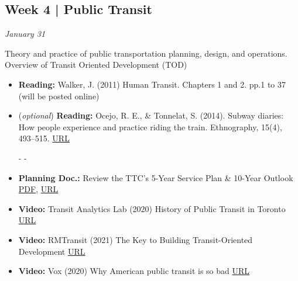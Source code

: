 \documentclass[11pt]{article}
\begin{document}
	
	

	

		
	\subsection*{Week 4 | Public Transit}
	
	\textit{January 31}
	
	Theory and practice of public transportation planning, design, and operations. Overview of Transit Oriented Development (TOD)
	
	\begin{itemize}
		\item \textbf{Reading:} Walker, J. (2011) Human Transit. Chapters 1 and 2. pp.1 to 37 (will be posted online)
		
		\item (\textit{optional}) \textbf{Reading:} Ocejo, R. E., \& Tonnelat, S. (2014). Subway diaries: How people experience and practice riding the train. Ethnography, 15(4), 493–515.
		\href{https://doi.org/10.1177/1466138113491171}{URL}
		
		- -
		
		\item \textbf{Planning Doc.:} Review the TTC’s 5-Year Service Plan \& 10-Year Outlook \href{https://ttc-cdn.azureedge.net/-/media/Project/TTC/DevProto/Documents/Home/About-the-TTC/5_year_plan_10_year_outlook/Attachment-1-TTC_5_year_SP_web_accessible_R3.pdf?rev=69cfa3fbb3034d8a8ca5aaff03bf6a17&hash=9208204C7255C70154C0DFD161BA16F9}{PDF}, \href{https://www.ttc.ca/about-the-ttc/projects-and-plans/5-Year-Service-Plan-and-10-Year-Outlook}{URL}
		
		\item \textbf{Video:} Transit Analytics Lab (2020) History of Public Transit in Toronto \href{https://www.youtube.com/watch?v=0Rd4RzsRsWg}{URL}
		
		\item \textbf{Video:} RMTransit (2021) The Key to Building Transit-Oriented Development \href{https://www.youtube.com/watch?v=5HSI_PZBsPc}{URL}
		
		\item \textbf{Video:} Vox (2020) Why American public transit is so bad \href{https://www.youtube.com/watch?v=-ZDZtBRTyeI}{URL}
		
	\end{itemize}
	
\end{document}
